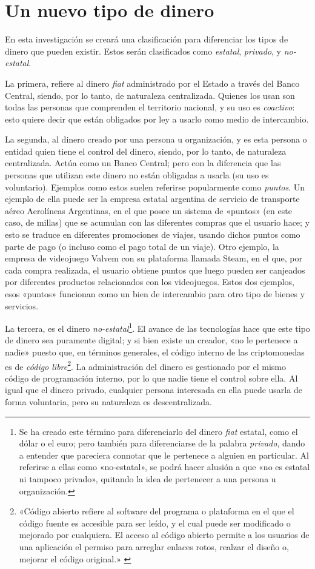 \documentclass[12pt,a4paper,twoside]{book}
\begin{document}
\section{Un nuevo tipo de dinero}
En esta investigación se creará una clasificación para diferenciar los tipos de dinero que pueden existir. Estos serán clasificados como \textit{estatal}, \textit{privado}, y \textit{no-estatal}.

La primera, refiere al dinero \textit{fiat} administrado por el Estado a través del Banco Central, siendo, por lo tanto, de naturaleza centralizada. Quienes los usan son todas las personas que comprenden el territorio nacional, y su uso es \textit{coactivo}: esto quiere decir que están obligados por ley a usarlo como medio de intercambio.

La segunda, al dinero creado por una persona u organización, y es esta persona o entidad quien tiene el control del dinero, siendo, por lo tanto, de naturaleza centralizada. Actúa como un Banco Central; pero con la diferencia que las personas que utilizan este dinero no están obligadas a usarla (su uso es voluntario). Ejemplos como estos suelen referirse popularmente como \textit{puntos}. Un ejemplo de ella puede ser la empresa estatal argentina de servicio de transporte aéreo Aerolíneas Argentinas, en el que posee un sistema de «puntos» (en este caso, de millas) que se acumulan con las diferentes compras que el usuario hace; y esto se traduce en diferentes promociones de viajes, usando dichos puntos como parte de pago (o incluso como el pago total de un viaje). Otro ejemplo, la empresa de videojuego Valvem con su plataforma llamada Steam, en el que, por cada compra realizada, el usuario obtiene puntos que luego pueden ser canjeados por diferentes productos relacionados con los videojuegos. Estos dos ejemplos, esos «puntos» funcionan como un bien de intercambio para otro tipo de bienes y servicios.

La tercera, es el dinero \textit{no-estatal}\footnote{Se ha creado este término para diferenciarlo del dinero \textit{fiat} estatal, como el dólar o el euro; pero también para diferenciarse de la palabra \textit{privado}, dando a entender que pareciera connotar que le pertenece a alguien en particular. Al referirse a ellas como «no-estatal», se podrá hacer alusión a que «no es estatal ni tampoco privado», quitando la idea de pertenecer a una persona u organización.}. El avance de las tecnologías hace que este tipo de dinero sea puramente digital; y si bien existe un creador, «no le pertenece a nadie» puesto que, en términos generales, el código interno de las criptomonedas es de \textit{código libre}\footnote{«Código abierto refiere al software del programa o plataforma en el que el código fuente es accesible para ser leído, y el cual puede ser modificado o mejorado por cualquiera. El acceso al código abierto permite a los usuarios de una aplicación el permiso para arreglar enlaces rotos, realzar el diseño o, mejorar el código original.» \cite{codigoabierto}}. La administración del dinero es gestionado por el mismo código de programación interno, por lo que nadie tiene el control sobre ella. Al igual que el dinero privado, cualquier persona interesada en ella puede usarla de forma voluntaria, pero su naturaleza es descentralizada.
\end{document}
